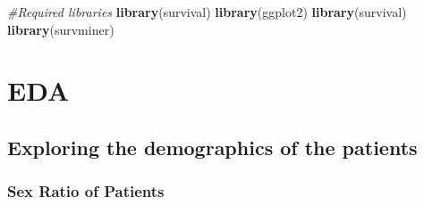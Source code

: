 \documentclass[
]{article}
\newenvironment{Shaded}{\begin{snugshade}}{\end{snugshade}}
\newcommand{\CommentTok}[1]{\textcolor[rgb]{0.56,0.35,0.01}{\textit{#1}}}
\newcommand{\FunctionTok}[1]{\textcolor[rgb]{0.13,0.29,0.53}{\textbf{#1}}}
\newcommand{\NormalTok}[1]{#1}
\begin{document}
\begin{Shaded}
\begin{Highlighting}[]
\CommentTok{\#Required libraries}
\FunctionTok{library}\NormalTok{(survival)}
\FunctionTok{library}\NormalTok{(ggplot2)}
\FunctionTok{library}\NormalTok{(survival)}
\FunctionTok{library}\NormalTok{(survminer)}
\end{Highlighting}
\end{Shaded}

\hypertarget{eda}{%
\section{EDA}\label{eda}}

\hypertarget{exploring-the-demographics-of-the-patients}{%
\subsection{Exploring the demographics of the
patients}\label{exploring-the-demographics-of-the-patients}}

\hypertarget{sex-ratio-of-patients}{%
\subsubsection{Sex Ratio of Patients}\label{sex-ratio-of-patients}}
\end{document}
